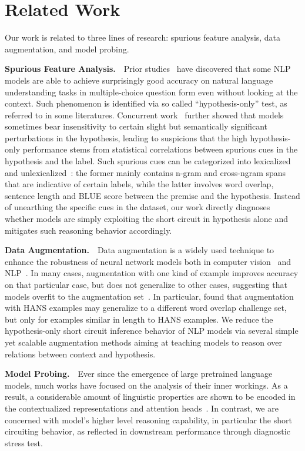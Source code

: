 \section{Related Work}
Our work is  related to three lines of research: spurious feature analysis, data augmentation, and model probing.


\textbf{Spurious Feature Analysis.}~~Prior studies~\cite{endingonly1,srinivasan2018simple,zellers2018swag} have discovered that some NLP models are able to achieve surprisingly good accuracy on natural language understanding tasks in multiple-choice question form even without looking at the context. Such phenomenon is identified via so called ``hypothesis-only'' test, as referred to in some literatures. Concurrent work~\cite{sanchez2018behavior} further showed that models sometimes bear insensitivity to certain slight but semantically significant perturbations in the hypothesis, leading to suspicions that the high hypothesis-only performance  stems from statistical correlations between spurious cues in the hypothesis and the label. Such spurious cues can be categorized into lexicalized~\cite{naik2018stress,sanchez2018behavior,mccoy2019right} and unlexicalized~\cite{bowman2015large}: the former mainly contains n-gram and cross-ngram spans that are indicative of certain labels, while the latter involves word overlap, sentence length and BLUE score between the premise and the hypothesis. Instead of unearthing the specific cues in the dataset, our work directly diagnoses whether models are simply exploiting the short circuit in hypothesis alone and mitigates such reasoning behavior accordingly.

\textbf{Data Augmentation.}~~Data augmentation is a widely used technique to enhance the robustness of neural network models both in computer vision~\cite{perez2017} and NLP~\cite{belinkov2017,Minervini2018,Yanaka2019}. In many cases, augmentation with one kind of example improves accuracy on that particular case, but does not generalize to other cases, suggesting that models overfit to the augmentation set~\cite{Iyyer2018,Liu2019a}. In particular, \citeauthor{mccoy2019right} found that augmentation with HANS examples may generalize to a different word overlap challenge set, but only for examples similar in length to HANS examples. We reduce the hypothesis-only short circuit inference behavior of NLP models via several simple yet scalable augmentation methods aiming at teaching models to reason over relations between context and hypothesis.

\textbf{Model Probing.}~~Ever since the emergence of large pretrained language models, much works have focused on the analysis of their inner workings. As a result, a considerable amount of linguistic properties are shown to be encoded in the contextualized representations and attention heads~\cite{goldberg2019,clark2019,liu-etal-2019-linguistic,tenny2019}. In contrast, we are concerned with model's higher level reasoning capability, in particular the short circuiting behavior, as reflected in downstream performance through diagnostic stress test.

